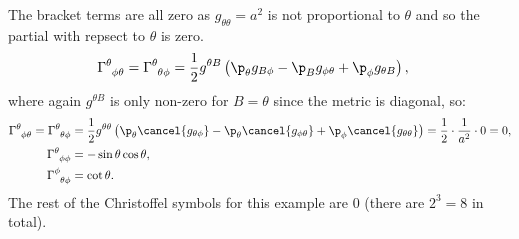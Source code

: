 \documentclass[a4paper, 11pt, normalem]{report}
\begin{document}
\begin{example}
The bracket terms are all zero as $g_{\theta\theta}=a^2$ is not proportional to $\theta$ and so the partial with repsect to $\theta$ is zero.
\begin{align}
    \tensor{\Gamma}{^\theta_{\phi\theta}} = \tensor{\Gamma}{^\theta_{\theta\phi}} &= \frac12 g^{\theta B}\left(\p_\theta g_{B\phi} - \p_B g_{\phi\theta} + \p_\phi g_{\theta B}\right),
\end{align}
where again $g^{\theta B}$ is only non-zero for $B=\theta$ since the metric is diagonal, so:
\begin{align}
    \tensor{\Gamma}{^\theta_{\phi\theta}} = \tensor{\Gamma}{^\theta_{\theta\phi}} &= \frac12 g^{\theta\theta}\left(\p_\theta \cancel{g_{\theta\phi}} - \p_\theta \cancel{g_{\phi\theta}} + \p_\phi \cancel{g_{\theta\theta}}\right) = \frac12\cdot\frac{1}{a^2}\cdot0 = 0, \\
    \tensor{\Gamma}{^\theta_{\phi\phi}} &= -\sin\theta\cos\theta, \\
    \tensor{\Gamma}{^\phi_{\theta\phi}} &= \cot\theta.
\end{align}
The rest of the Christoffel symbols for this example are 0 (there are $2^3=8$ in total).
\end{example}
\end{document}
